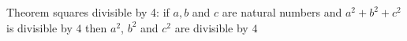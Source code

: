 Theorem squares divisible by 4: if $a, b$ and $c$ are natural numbers and $a^2 + b^2 + c^2$ is divisible by $4$ then $a^2$, $b^2$ and $c^2$ are divisible by $4$

